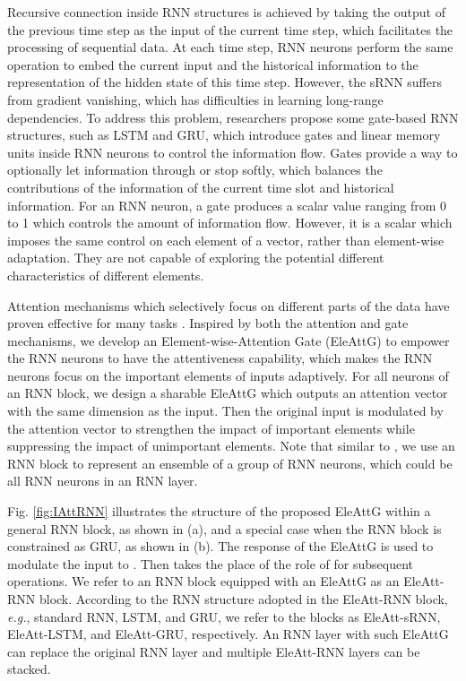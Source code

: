 \documentclass[journal]{IEEEtran}
\newcommand{\Outer}{Element-wise}
\newcommand{\EleAttGn}{{EleAttG}}
\begin{document}
Recursive connection inside RNN structures is achieved by taking the output of the previous time step as the input of the current time step, which facilitates the processing of sequential data. At each time step, RNN neurons perform the same operation to embed the current input and the historical information to the representation of the hidden state of this time step. However, the sRNN suffers from gradient vanishing, which has difficulties in learning long-range dependencies. To address this problem, researchers propose some gate-based RNN structures, such as LSTM and GRU, which introduce gates and linear memory units inside RNN neurons to control the information flow. Gates provide a way to optionally let information through or stop softly, which balances the contributions of the information of the current time slot and historical information. For an RNN neuron, a gate produces a scalar value ranging from 0 to 1 which controls the amount of information flow. However, it is a scalar which imposes the same control on each element of a vector, rather than element-wise adaptation. They are not capable of exploring the potential different characteristics of different elements.

Attention mechanisms which selectively focus on different parts of the data have proven effective for many tasks \cite{luong2015effective,vaswani2017attention,xu2015show,li2017attentive,sharma2015actionattention,wang2016hierarchical}. Inspired by both the attention and gate mechanisms, we develop an \Outer-Attention Gate (\EleAttGn) to empower the RNN neurons to have the attentiveness capability, which makes the RNN neurons focus on the important elements of inputs adaptively. For all neurons of an RNN block, we design a sharable {\EleAttGn} which outputs an attention vector with the same dimension as the input. Then the original input is modulated by the attention vector to strengthen the impact of important elements while suppressing the impact of unimportant elements. Note that similar to \cite{LSTMblog}, we use an RNN block to represent an ensemble of a group of  RNN neurons, which could be all RNN neurons in an RNN layer.

Fig. \ref{fig:IAttRNN} illustrates the structure of the proposed {\EleAttGn} within a general RNN block, as shown in (a), and a special case when the RNN block is constrained as GRU, as shown in (b). The response  of the {\EleAttGn} is used to modulate the input  to . Then  takes the place of the role of  for subsequent operations. We refer to an RNN block equipped with an EleAttG as an EleAtt-RNN block. According to the RNN structure adopted in the EleAtt-RNN block, {\it e.g.}, standard RNN, LSTM, and GRU, we refer to the blocks as EleAtt-sRNN, EleAtt-LSTM, and EleAtt-GRU, respectively. An RNN layer with such EleAttG can replace the original RNN layer and multiple EleAtt-RNN layers can be stacked.
\end{document}

